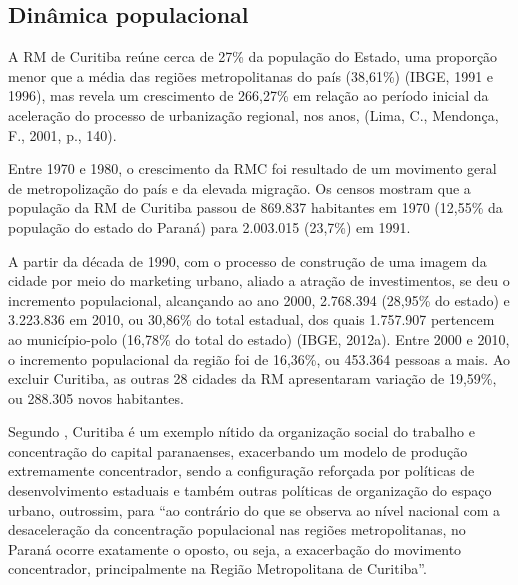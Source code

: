 	\subsection{Dinâmica populacional}
	
	A RM de Curitiba reúne cerca de 27\% da população do Estado,  uma proporção menor que a média das regiões metropolitanas do país (38,61\%) (IBGE, 1991 e 1996), mas revela um  crescimento de 266,27\% em relação ao período inicial da aceleração do processo de urbanização regional, nos anos, (Lima, C., Mendonça, F., 2001, p., 140).
	
	Entre 1970 e 1980, o crescimento da RMC foi resultado de um movimento geral de metropolização do país e da elevada migração. Os censos mostram que a população da RM de Curitiba passou de 869.837 habitantes em 1970 (12,55\% da população do estado do Paraná) para 2.003.015 (23,7\%) em 1991.
	
	A partir da década de 1990, com o processo de construção de uma imagem da cidade por meio do marketing urbano, aliado a atração de investimentos, se deu o incremento populacional, alcançando ao ano 2000, 2.768.394 (28,95\% do estado) e 3.223.836 em 2010, ou 30,86\% do total estadual, dos quais 1.757.907 pertencem ao município-polo (16,78\% do total do estado) (IBGE, 2012a). Entre 2000 e 2010, o incremento populacional da região foi de 16,36\%, ou 453.364 pessoas a mais. Ao excluir Curitiba, as outras 28 cidades da RM apresentaram variação de 19,59\%, ou 288.305 novos habitantes.
	
	Segundo , Curitiba é um exemplo nítido da organização social do trabalho e concentração do capital paranaenses, exacerbando um modelo de produção extremamente concentrador, sendo a configuração reforçada por políticas de desenvolvimento estaduais e também outras políticas de organização do espaço urbano, outrossim, para  ``ao contrário do que se observa ao nível nacional com a desaceleração da concentração populacional nas regiões metropolitanas, no Paraná ocorre exatamente o oposto, ou seja, a exacerbação do movimento concentrador, principalmente na Região Metropolitana de Curitiba''.
	
